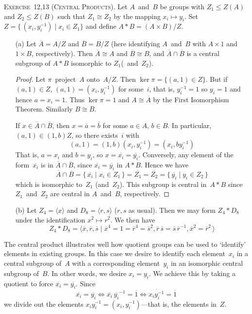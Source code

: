\documentclass[letterpaper]{article}
\newcommand{\exercise}[1]{\goodbreak\noindent\textsc{Exercise~{#1}.}}
\newcommand{\iso}{\cong}
\newcommand{\sect}{\cap}
\newcommand{\subgroup}{\le}
\newcommand{\res}[1]{\overline{#1}}
\newcommand{\gen}[1]{\langle{#1}\rangle}
\begin{document}
\exercise{12,13 (Central Products)}
Let $A$~and~$B$ be groups with $Z_1\subgroup Z(A)$ and $Z_2\subgroup Z(B)$ such that $Z_1\iso Z_2$ by the mapping $x_i\mapsto y_i$. Set $Z=\{\,(x_i,y_i^{-1})\mid x_i\in Z_1\}$ and define $A*B=(A\times B)/Z$.
\begin{enumerate}[itemsep=0pt]
\item[(a)] Let $\res{A}=A/Z$ and $\res{B}=B/Z$ (here identifying $A$~and~$B$ with $A\times 1$ and $1\times B$, respectively). Then $\res{A}\iso A$ and $\res{B}\iso B$, and $\res{A}\sect\res{B}$ is a central subgroup of $A*B$ isomorphic to $Z_1$(~and~$Z_2$).
\begin{proof}
Let $\pi$~project~$A$ onto~$A/Z$. Then $\ker\pi=\{(a,1)\in Z\}$. But if $(a,1)\in Z$, $(a,1)=(x_i,y_i^{-1})$ for some~$i$, that is, $y_i^{-1}=1$ so $y_i=1$ and hence $a=x_i=1$. Thus $\ker\pi=1$ and $A\iso\res{A}$ by the First Isomorphism Theorem. Similarly $B\iso\res{B}$.

If $x\in\res{A}\sect\res{B}$, then $x=\res{a}=\res{b}$ for some $a\in A$, $b\in B$. In particular, $(a,1)\in(1,b)Z$, so there exists~$i$ with
$$(a,1)=(1,b)(x_i,y_i^{-1})=(x_i,by_i^{-1})$$
That is, $a=x_i$ and $b=y_i$, so $x=\res{x_i}=\res{y_i}$. Conversely, any element of the form~$\res{x_i}$ is in $\res{A}\sect\res{B}$, since $\res{x_i}=\res{y_i}$ in $A*B$. Hence we have
$$\res{A}\sect\res{B}=\{\,\res{x_i}\mid x_i\in Z_1\,\}=\res{Z_1}=\res{Z_2}=\{\,\res{y_i}\mid y_i\in Z_2\,\}$$
which is isomorphic to~$Z_1$ (and~$Z_2$). This subgroup is central in~$A*B$ since $Z_1$~and~$Z_2$ are central in $A$~and~$B$, respectively.
\end{proof}
\item[(b)] Let $Z_4=\gen{x}$ and $D_8=\gen{r,s}$ ($r,s$ as usual). Then we may form $Z_4*D_8$ under the identification $x^2\mapsto r^2$. We then have
$$Z_4*D_8=\gen{\res{x},\res{r},\res{s}\mid\res{x}^4=1=\res{r}^4=\res{s}^2,\res{r}\,\res{s}=\res{s}\,\res{r}^{-1},\res{x}^2=\res{r}^2\,}$$
\end{enumerate}
\noindent The central product illustrates well how quotient groups can be used to `identify' elements in existing groups. In this case we desire to identify each element~$x_i$ in a central subgroup of~$A$ with a corresponding element~$y_i$ in an isomorphic central subgroup of~$B$. In other words, we desire $x_i=y_i$. We achieve this by taking a quotient to force $\res{x_i}=\res{y_i}$. Since
$$\res{x_i}=\res{y_i}\iff\res{x_i}\,\res{y_i}^{-1}=\res{1}\iff\res{x_iy_i^{-1}}=\res{1}$$
we divide out the elements $x_iy_i^{-1}=(x_i,y_i^{-1})$---that is, the elements in~$Z$.
\end{document}
